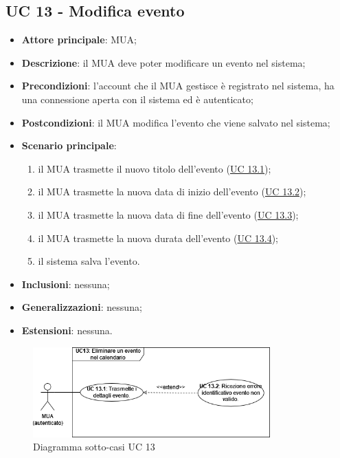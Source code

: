 \subsection{UC 13 - Modifica evento} \label{sec:UC13}
    \begin{itemize}
        \item \textbf{Attore principale}: MUA;
        \item \textbf{Descrizione}: il MUA deve poter modificare un evento nel sistema;
        \item \textbf{Precondizioni}: l’account che il MUA gestisce è registrato nel sistema, ha una connessione aperta con il sistema ed è autenticato;
        \item \textbf{Postcondizioni}: il MUA modifica l'evento che viene salvato nel sistema;
        \item \textbf{Scenario principale}:
            \begin{enumerate}
                \item il MUA trasmette il nuovo titolo dell'evento (\hyperref[sec:UC13.1]{UC 13.1});
                \item il MUA trasmette la nuova data di inizio dell'evento (\hyperref[sec:UC13.2]{UC 13.2});
                \item il MUA trasmette la nuova data di fine dell'evento (\hyperref[sec:UC13.3]{UC 13.3});
                \item il MUA trasmette la nuova durata dell'evento (\hyperref[sec:UC13.4]{UC 13.4});
                \item il sistema salva l'evento.
            \end{enumerate}
        \item \textbf{Inclusioni}: nessuna;
        \item \textbf{Generalizzazioni}: nessuna;
        \item \textbf{Estensioni}: nessuna.
    \end{itemize}

\begin{figure}[H]
    \includegraphics[width=0.813\textwidth]{sections/uc_imgs/UC13.png}
    \centering
    \caption{Diagramma sotto-casi UC 13}
\end{figure}

